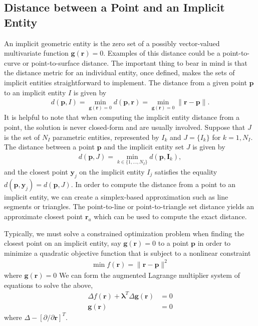  \subsection{Distance between a Point and an Implicit Entity}
%
An implicit geometric entity is the zero set of a possibly vector-valued multivariate function $\bm{g}(\bm{r})= 0$. Examples of this distance could be a point-to-curve or point-to-surface distance. The important thing to bear in mind is that the distance metric for an individual entity, once defined, makes the sets of implicit entities straightforward to implement. The distance from a given point $\bm{p}$ to an implicit entity $I$ is given by 
%
\begin{align}
	d(\bm{p}, I) = \min_{\bm{g}(\bm{r}) = 0} d(\bm{p}, \bm{r}) = \min_{\bm{g}(\bm{r}) = 0} \|\bm{r} - \bm{p}\|.	
\end{align}
%
It is helpful to note that when computing the implicit entity distance from a point, the solution is never closed-form and are usually involved. Suppose that $J$ is the set of $N_I$ parametric entities, represented by $I_k$ and $J=\{I_k\}$ for $k=1, N_I$. The distance between a point $\bm{p}$ and the implicit entity set $J$ is given by 
%
\begin{align}
	d(\bm{p}, J) = \min_{k\in \{1,\ldots, N_I\}} d(\bm{p}, \bm{I}_k),
\end{align}
%
and the closest point $\bm{y}_j$ on the implicit entity $I_j$ satisfies the equality $d(\bm{p}, \bm{y}_j) = d(\bm{p}, J)$. In order to compute the distance from a point to an implicit entity, we can create a simplex-based approximation such as line segments or triangles. The point-to-line or point-to-triangle set distance yields an approximate closest point $\bm{r}_a$ which can be used to compute the exact distance.

Typically, we must solve a constrained optimization problem when finding the closest point on an implicit entity, say $\bm{g}(\bm{r})=0$ to a point $\bm{p}$ in order to minimize a quadratic objective function that is subject to a nonlinear constraint 
%
\begin{align}
	\min f(\bm{r}) = \| \bm{r} - \bm{p} \|^2 
\end{align}
%
where $\bm{g}(\bm{r}) = 0$
%
We can form the augmented Lagrange multiplier system of equations to solve the above, \ie 
%
\begin{align}
	\Delta f(\bm{r}) + \bm{\lambda}^T \Delta \bm{g}(\bm{r}) &= 0 \nonumber \\
	\bm{g}(\bm{r}) &= 0
\end{align}
%
where $\Delta - [\partial/\partial \bm{r}]^T$.

